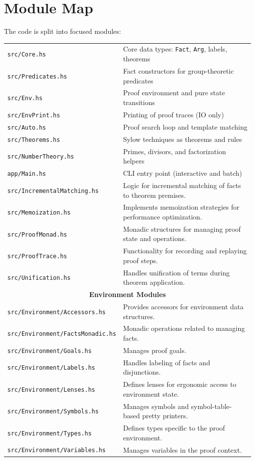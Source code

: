 \documentclass[11pt,oneside]{article}
\begin{document}
\section{Module Map}
The code is split into focused modules:
\begin{center}
\begin{tabular}{ll}
\texttt{src/Core.hs} & Core data types: \texttt{Fact}, \texttt{Arg}, labels, theorems \\
\texttt{src/Predicates.hs} & Fact constructors for group-theoretic predicates \\
\texttt{src/Env.hs} & Proof environment and pure state transitions \\
\texttt{src/EnvPrint.hs} & Printing of proof traces (IO only) \\
\texttt{src/Auto.hs} & Proof search loop and template matching \\
\texttt{src/Theorems.hs} & Sylow techniques as theorems and rules \\
\texttt{src/NumberTheory.hs} & Primes, divisors, and factorization helpers \\

\texttt{app/Main.hs} & CLI entry point (interactive and batch) \\
\texttt{src/IncrementalMatching.hs} & Logic for incremental matching of facts to theorem premises. \\
\texttt{src/Memoization.hs} & Implements memoization strategies for performance optimization. \\
\texttt{src/ProofMonad.hs} & Monadic structures for managing proof state and operations. \\
\texttt{src/ProofTrace.hs} & Functionality for recording and replaying proof steps. \\
\texttt{src/Unification.hs} & Handles unification of terms during theorem application. \\
\multicolumn{2}{c}{\textbf{Environment Modules}} \\
\texttt{src/Environment/Accessors.hs} & Provides accessors for environment data structures. \\

\texttt{src/Environment/FactsMonadic.hs} & Monadic operations related to managing facts. \\
\texttt{src/Environment/Goals.hs} & Manages proof goals. \\
\texttt{src/Environment/Labels.hs} & Handles labeling of facts and disjunctions. \\
\texttt{src/Environment/Lenses.hs} & Defines lenses for ergonomic access to environment state. \\
\texttt{src/Environment/Symbols.hs} & Manages symbols and symbol-table-based pretty printers. \\
\texttt{src/Environment/Types.hs} & Defines types specific to the proof environment. \\
\texttt{src/Environment/Variables.hs} & Manages variables in the proof context.
\end{tabular}
\end{center}
\end{document}
